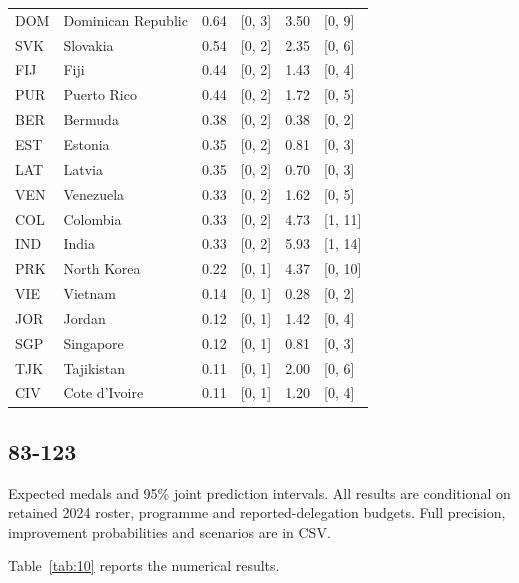 \documentclass[11pt,a4paper]{article}
\begin{document}
{\begin{longtable}{@{}L{1.098cm} L{4.464cm} R{1.463cm} R{2.195cm} R{1.610cm} R{2.342cm}@{}}
DOM & Dominican Republic & 0.64 & [0, 3] & 3.50 & [0, 9]\\
SVK & Slovakia & 0.54 & [0, 2] & 2.35 & [0, 6]\\
FIJ & Fiji & 0.44 & [0, 2] & 1.43 & [0, 4]\\
PUR & Puerto Rico & 0.44 & [0, 2] & 1.72 & [0, 5]\\
BER & Bermuda & 0.38 & [0, 2] & 0.38 & [0, 2]\\
EST & Estonia & 0.35 & [0, 2] & 0.81 & [0, 3]\\
LAT & Latvia & 0.35 & [0, 2] & 0.70 & [0, 3]\\
VEN & Venezuela & 0.33 & [0, 2] & 1.62 & [0, 5]\\
COL & Colombia & 0.33 & [0, 2] & 4.73 & [1, 11]\\
IND & India & 0.33 & [0, 2] & 5.93 & [1, 14]\\
PRK & North Korea & 0.22 & [0, 1] & 4.37 & [0, 10]\\
VIE & Vietnam & 0.14 & [0, 1] & 0.28 & [0, 2]\\
JOR & Jordan & 0.12 & [0, 1] & 1.42 & [0, 4]\\
SGP & Singapore & 0.12 & [0, 1] & 0.81 & [0, 3]\\
TJK & Tajikistan & 0.11 & [0, 1] & 2.00 & [0, 6]\\
CIV & Cote d'Ivoire & 0.11 & [0, 1] & 1.20 & [0, 4]\\
\bottomrule
\end{longtable}}
\par{}
\clearpage
\subsection*{83-123}
Expected medals and 95\% joint prediction intervals. All results are conditional on retained 2024 roster, programme and reported-delegation budgets. Full precision, improvement probabilities and scenarios are in CSV.

Table~\ref{tab:10} reports the numerical results.
\end{document}
